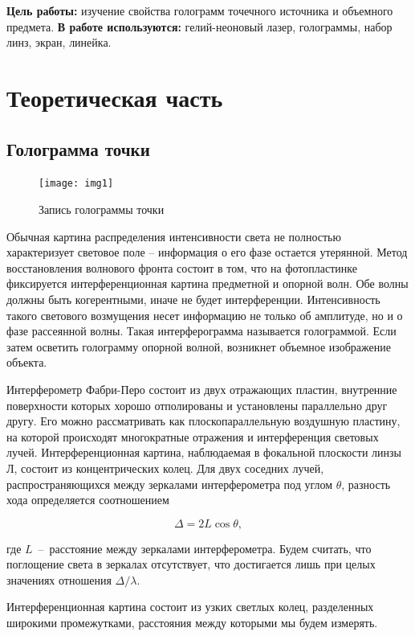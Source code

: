 \documentclass{letask}
\begin{document}


\textbf{Цель работы:}
изучение свойства голограмм точечного источника и объемного предмета.
\textbf{В работе используются:} гелий-неоновый лазер, голограммы, набор линз, экран, линейка.

\section{Теоретическая часть}

\subsection*{Голограмма точки}
\begin{figure}
\texttt{[image: img1]}
\caption{Запись голограммы точки}
\end{figure}
Обычная картина распределения интенсивности света не полностью характеризует световое поле -- информация о его фазе остается утерянной. Метод \textsf{восстановления волнового фронта} состоит в том, что на фотопластинке фиксируется интерференционная картина предметной и \textsf{опорной} волн. Обе волны должны быть когерентными, иначе не будет интерференции. Интенсивность такого светового возмущения несет информацию не только об амплитуде, но и о фазе рассеянной волны. Такая интерферограмма называется \textsf{голограммой}. Если затем осветить голограмму опорной волной, возникнет объемное изображение объекта.

Интерферометр Фабри-Перо состоит из двух отражающих пластин, внутренние поверхности которых хорошо отполированы и установлены параллельно друг другу. Его можно рассматривать как плоскопараллельную воздушную пластину, на которой происходят многократные отражения и интерференция световых лучей. Интерференционная картина, наблюдаемая в фокальной плоскости линзы Л, состоит из концентрических колец. 
Для двух соседних лучей, распространяющихся между зеркалами интерферометра под углом $\theta$, разность хода определяется соотношением
 
\begin{equation}
\Delta = 2 L \cos \theta,
\label{eq:dif}
\end{equation}

где $L$~--~расстояние между зеркалами интерферометра.
Будем считать, что поглощение света в зеркалах отсутствует, что достигается лишь при целых значениях отношения $\Delta / \lambda$.

Интерференционная картина состоит из узких светлых колец, разделенных широкими промежутками, расстояния между которыми мы будем измерять.
\end{document}
